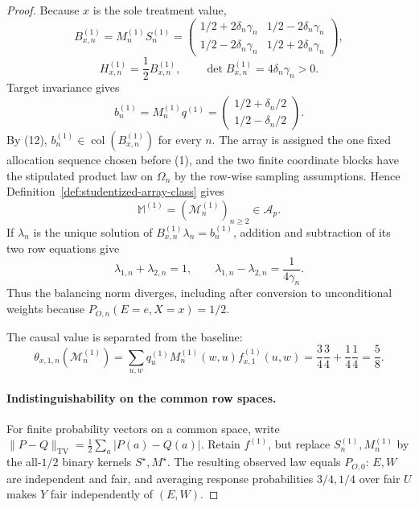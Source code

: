 \documentclass{article}
\begin{document}
\begin{proof}
Because \(x\) is the sole treatment value,
\[
B^{(1)}_{x,n}=M^{(1)}_nS^{(1)}_n
=\begin{pmatrix}
1/2+2\delta_n\gamma_n&1/2-2\delta_n\gamma_n\\
1/2-2\delta_n\gamma_n&1/2+2\delta_n\gamma_n
\end{pmatrix},
\tag{11}
\]
\[
H^{(1)}_{x,n}=\frac12B^{(1)}_{x,n},
\qquad
\det B^{(1)}_{x,n}=4\delta_n\gamma_n>0.
\tag{12}
\]
Target invariance gives
\[
b^{(1)}_n=M^{(1)}_nq^{(1)}
=\begin{pmatrix}1/2+\delta_n/2\\1/2-\delta_n/2\end{pmatrix}.
\tag{13}
\]
By (12), \(b^{(1)}_n\in\operatorname{col}(B^{(1)}_{x,n})\) for every \(n\). The array is assigned the one fixed allocation sequence chosen before (1), and the two finite coordinate blocks have the stipulated product law on \(\Omega_n\) by the row-wise sampling assumptions. Hence Definition~\ref{def:studentized-array-class} gives
\[
\mathbb M^{(1)}=(\mathcal M^{(1)}_n)_{n\ge2}\in\mathcal A_p.
\tag{14}
\]
If \(\lambda_n\) is the unique solution of \(B^{(1)}_{x,n}\lambda_n=b^{(1)}_n\), addition and subtraction of its two row equations give
\[
\lambda_{1,n}+\lambda_{2,n}=1,
\qquad
\lambda_{1,n}-\lambda_{2,n}=\frac1{4\gamma_n}.
\tag{15}
\]
Thus the balancing norm diverges, including after conversion to unconditional weights because \(P_{O,n}(E=e,X=x)=1/2\).

The causal value is separated from the baseline:
\[
\theta_{x,1,n}(\mathcal M^{(1)}_n)
=\sum_{u,w}q^{(1)}_uM^{(1)}_n(w,u)f^{(1)}_{x,1}(u,w)
=\frac34\frac34+\frac14\frac14
=\frac58.
\tag{16}
\]

\paragraph{Indistinguishability on the common row spaces.}
For finite probability vectors on a common space, write \(\lVert P-Q\rVert_{\mathrm{TV}}=\frac12\sum_a|P(a)-Q(a)|\). Retain \(f^{(1)}\), but replace \(S^{(1)}_n,M^{(1)}_n\) by the all-\(1/2\) binary kernels \(S^{\star},M^{\star}\). The resulting observed law equals \(P_{O,0}\): \(E,W\) are independent and fair, and averaging response probabilities \(3/4,1/4\) over fair \(U\) makes \(Y\) fair independently of \((E,W)\).


\end{proof}
\end{document}
